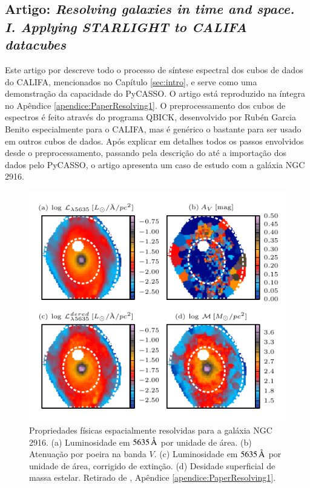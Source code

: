 
\subsection{Artigo: {\em Resolving galaxies in time and space. I. Applying
STARLIGHT to CALIFA datacubes}}
\label{sec:pycasso:art:Resolving1}

Este artigo por \citet{CidFernandes2013} descreve todo o processo de síntese
espectral dos cubos de dados do CALIFA, mencionados no Capítulo \ref{sec:intro},
e serve como uma demonstração da capacidade do PyCASSO. O artigo está
reproduzido na íntegra no Apêndice \ref{apendice:PaperResolving1}. O
preprocessamento dos cubos de espectros é feito através do programa QBICK,
desenvolvido por Rubén Garcia Benito especialmente para o CALIFA, mas é genérico
o bastante para ser usado em outros cubos de dados. Após explicar em detalhes
todos os passos envolvidos desde o preprocessamento, passando pela descrição do
\starlight até a importação dos dados pelo PyCASSO, o artigo apresenta um caso
de estudo com a galáxia NGC 2916.

\begin{figure}
	\includegraphics{figuras/L-M-AV-K0277}
	\caption[Propriedades físicas espacialmente resolvidas para a galáxia NGC
	2916] {Propriedades físicas espacialmente resolvidas para a galáxia NGC 2916. (a)
	Luminosidade em $5635\,\text{\normalfont\AA}$ por unidade de área. (b) Atenuação por
	poeira na banda $V$. (c) Luminosidade em $5635\,\text{\normalfont\AA}$ por unidade de área,
	corrigido de extinção. (d) Desidade superficial de massa estelar. Retirado de
	\cite[figura 4]{CidFernandes2013}, Apêndice \ref{apendice:PaperResolving1}.}
	\label{fig:LMAVMap}
\end{figure}


